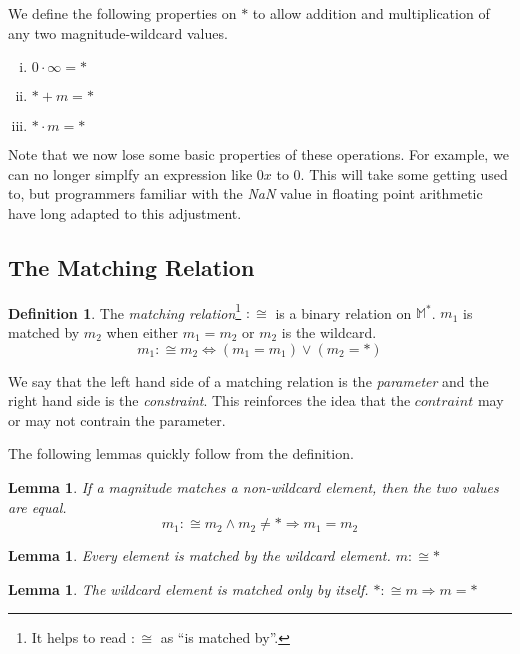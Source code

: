\documentclass[twoside]{article}
\newcommand{\quotes}[1]{``#1''}
\theoremstyle{plain}%
\newtheorem{lemma}[theorem]{Lemma}
\theoremstyle{definition}
\newtheorem{definition}{Definition}[section]
\theoremstyle{remark}
\begin{document}
We define the following properties on \(\ast\) to allow addition and multiplication of any two magnitude-wildcard values.
\begin{enumerate}[(i)]
  \item \(0 \cdot \infty = \ast\)
  \item \(\ast + m = \ast\)
  \item \(\ast \cdot m = \ast\)
\end{enumerate}

Note that we now lose some basic properties of these operations. For example, we can no longer simplfy an expression like \(0x\) to \(0\). This will take some getting used to, but programmers familiar with the \textit{NaN} value in floating point arithmetic have long adapted to this adjustment.

\subsection{The Matching Relation}

\begin{definition}
The \textit{matching relation}\footnote{It helps to read \(:\cong\) as \quotes{is matched by}.} \(:\cong\) is a binary relation on \(\mathbb{M}^*\). \(m_1\) is matched by \(m_2\) when either \(m_1 = m_2\) or  \(m_2\) is the wildcard.
\[m_1 :\cong m_2 \Longleftrightarrow (m_1 = m_1) \vee (m_2 = \ast)\]
\end{definition}

We say that the left hand side of a matching relation is the \textit{parameter} and the right hand side is the \textit{constraint}. This reinforces the idea that the \(contraint\) may or may not contrain the parameter.

The following lemmas quickly follow from the definition.

\begin{lemma}
\label{wild_prop_1} If a magnitude matches a non-wildcard element, then the two values are equal. \[m_1 :\cong m_2 \wedge m_2 \neq \ast \Longrightarrow m_1 = m_2\]
\end{lemma}

\begin{lemma}
\label{wild_prop_2}
Every element is matched by the wildcard element. \(m :\cong \ast\)
\end{lemma}

\begin{lemma}
\label{wild_prop_3}
The wildcard element is matched only by itself. \(\ast :\cong m \Longrightarrow m = \ast\)
\end{lemma}
\end{document}
